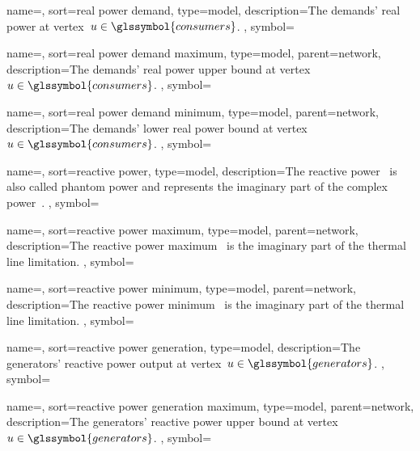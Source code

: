 {
    name={\realpowerdemand},
    sort={real power demand},
    type={model},
    description={The demands' real power at vertex~$\vertexa \in
    \glssymbol{consumers}$.
    },
    symbol={\realpowerdemand}
}

{
    name={\realpowerdemandmax},
    sort={real power demand maximum},
    type={model},
    parent={network},
    description={The demands' real power upper bound at vertex~$\vertexa \in
    \glssymbol{consumers}$.
    },
    symbol={\realpowerdemandmax}
}

{
    name={\realpowerdemandmin},
    sort={real power demand minimum},
    type={model},
    parent={network},
    description={The demands' lower real power bound at vertex~$\vertexa \in
    \glssymbol{consumers}$.
    },
    symbol={\realpowerdemandmin}
}

{
    name={\reactivepower},
    sort={reactive power},
    type={model},
    description={The reactive power~ is also called
    phantom power and represents the imaginary part of the complex
    power~.
    },
    symbol={\reactivepower}
}

{
    name={\reactivepowermax},
    sort={reactive power maximum},
    type={model},
    parent={network},
    description={The reactive power maximum~ is the
    imaginary part of the thermal line limitation.
    }, 
    symbol={\reactivepowermax}
}

{
    name={\reactivepowermin},
    sort={reactive power minimum},
    type={model},
    parent={network},
    description={The reactive power minimum~ is the
    imaginary part of the thermal line limitation.
    }, 
    symbol={\reactivepowermin}
}

{
    name={\reactivepowergeneration},
    sort={reactive power generation},
    type={model},
    description={The generators' reactive power output at vertex~$\vertexa \in
    \glssymbol{generators}$.
    },
    symbol={\reactivepowergeneration}
}

{
    name={\reactivepowergenerationmax},
    sort={reactive power generation maximum},
    type={model},
    parent={network},
    description={The generators' reactive power upper bound at vertex~$\vertexa
    \in \glssymbol{generators}$.
    },
    symbol={\reactivepowergenerationmax}
}

